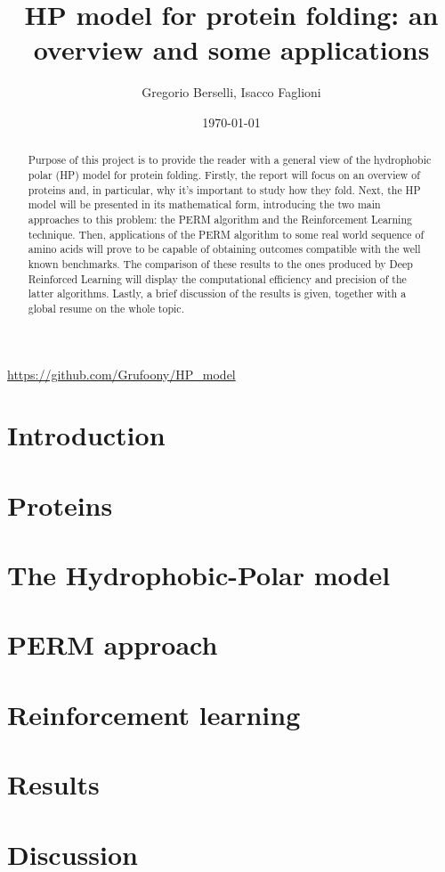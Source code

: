 \documentclass[12pt,a4paper]{article}
\title{HP model for protein folding: an overview and some applications}
\author{Gregorio Berselli, Isacco Faglioni}
\date{\today}
\begin{document}
\maketitle
\begin{center}
	\url{https://github.com/Grufoony/HP_model}
\end{center}

\begin{abstract}
Purpose of this project is to provide the reader with a general view of the hydrophobic polar (HP) model for protein folding.
Firstly, the report will focus on an overview of proteins and, in particular, why it's important to study how they fold.
Next, the HP model will be presented in its mathematical form, introducing the two main approaches to this problem: the PERM algorithm and the Reinforcement Learning technique.
Then, applications of the PERM algorithm to some real world sequence of amino acids will prove to be capable of obtaining outcomes compatible with the well known benchmarks. The comparison of these results to the ones produced by Deep Reinforced Learning will display the computational efficiency and precision of the latter algorithms.
Lastly, a brief discussion of the results is given, together with a global resume on the whole topic.
\end{abstract}
\thispagestyle{empty}

\newpage
\thispagestyle{empty}
\addtocounter{page}{-2}
\mbox{}

\tableofcontents
\pagebreak

\section*{Introduction}

\pagebreak

\section{Proteins}

\pagebreak

\section{The Hydrophobic-Polar model} \label{sec:model}

\pagebreak

\section{PERM approach}

\pagebreak

\section{Reinforcement learning} \label{sec:RL}

\pagebreak

\section{Results}

\pagebreak

\section{Discussion}

\pagebreak

\newpage
\thispagestyle{empty}
\mbox{}

\printbibliography
\end{document}

